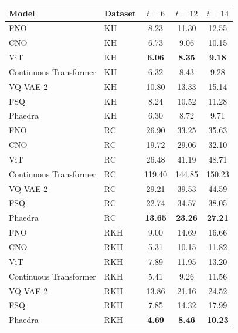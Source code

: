 \begin{tabular}{llccc}
\toprule
Model & Dataset & $t=6$ & $t=12$ & $t=14$ \\
\midrule
FNO & KH & 8.23 & 11.30 & 12.55 \\
CNO & KH & 6.73 & 9.06 & 10.15 \\
ViT & KH & \textbf{6.06} & \textbf{8.35} & \textbf{9.18} \\
Continuous Transformer & KH & 6.32 & 8.43 & 9.28 \\
VQ-VAE-2 & KH & 10.80 & 13.33 & 15.14 \\
FSQ & KH & 8.24 & 10.52 & 11.28 \\
Phaedra & KH & 6.30 & 8.72 & 9.71 \\
\midrule
FNO & RC & 26.90 & 33.25 & 35.63 \\
CNO & RC & 19.72 & 29.06 & 32.10 \\
ViT & RC & 26.48 & 41.19 & 48.71 \\
Continuous Transformer & RC & 119.40 & 144.85 & 150.23 \\
VQ-VAE-2 & RC & 29.21 & 39.53 & 44.59 \\
FSQ & RC & 22.74 & 34.57 & 38.05 \\
Phaedra & RC & \textbf{13.65} & \textbf{23.26} & \textbf{27.21} \\
\midrule
FNO & RKH & 9.00 & 14.69 & 16.66 \\
CNO & RKH & 5.31 & 10.15 & 11.82 \\
ViT & RKH & 7.89 & 11.95 & 13.20 \\
Continuous Transformer & RKH & 5.41 & 9.26 & 11.56 \\
VQ-VAE-2 & RKH & 13.86 & 21.16 & 24.52 \\
FSQ & RKH & 7.85 & 14.32 & 17.99 \\
Phaedra & RKH & \textbf{4.69} & \textbf{8.46} & \textbf{10.23} \\
\bottomrule
\end{tabular}
